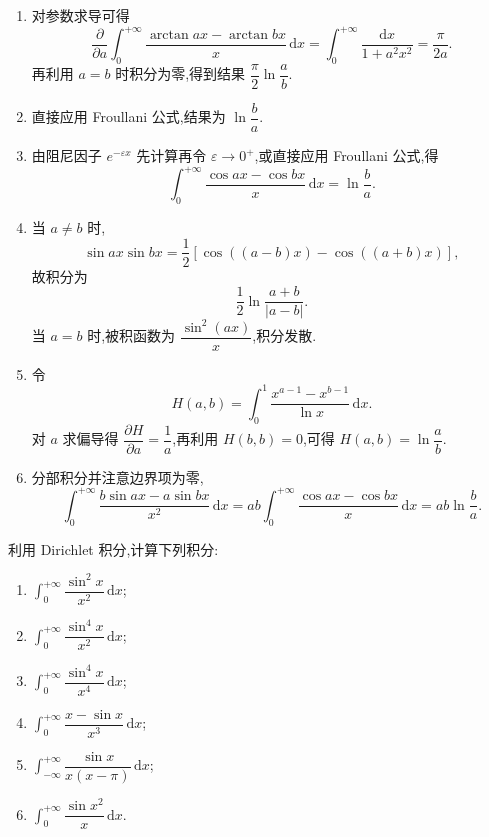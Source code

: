\begin{solution}
  \leavevmode
  \begin{enumerate}
    \item 对参数求导可得
          \[
            \dfrac{\partial}{\partial a}
            \int_0^{+\infty}\dfrac{\arctan ax-\arctan bx}{x}\,\mathrm{d}x
            =\int_0^{+\infty}\dfrac{\mathrm{d}x}{1+a^2x^2}=\dfrac{\pi}{2a}.
          \]
          再利用 $a=b$ 时积分为零,得到结果 $\dfrac{\pi}{2}\ln\dfrac{a}{b}$.

    \item 直接应用 Froullani 公式,结果为 $\ln\dfrac{b}{a}$.

    \item 由阻尼因子 $e^{-\varepsilon x}$ 先计算再令 $\varepsilon\to0^+$,或直接应用
          Froullani 公式,得
          \[
            \displaystyle\int_0^{+\infty}\dfrac{\cos ax-\cos bx}{x}\,\mathrm{d}x
            =\ln\dfrac{b}{a}.
          \]

    \item 当 $a\neq b$ 时,
          \[
            \sin ax\sin bx=\dfrac{1}{2}\left[\cos((a-b)x)-\cos((a+b)x)\right],
          \]
          故积分为
          \[
            \dfrac{1}{2}\ln\dfrac{a+b}{|a-b|}.
          \]
          当 $a=b$ 时,被积函数为 $\dfrac{\sin^2(ax)}{x}$,积分发散.

    \item 令
          \[
            H(a,b)=\int_0^1\dfrac{x^{a-1}-x^{b-1}}{\ln x}\,\mathrm{d}x.
          \]
          对 $a$ 求偏导得 $\dfrac{\partial H}{\partial a}=\dfrac{1}{a}$,再利用
          $H(b,b)=0$,可得 $H(a,b)=\ln\dfrac{a}{b}$.

    \item 分部积分并注意边界项为零,
          \[
            \displaystyle\int_0^{+\infty}\dfrac{b\sin ax-a\sin bx}{x^2}\,\mathrm{d}x
            =ab\int_0^{+\infty}\dfrac{\cos ax-\cos bx}{x}\,\mathrm{d}x
            =ab\ln\dfrac{b}{a}.
          \]
  \end{enumerate}
\end{solution}

\begin{example}
  利用 Dirichlet 积分,计算下列积分:
  \begin{enumerate}
    \item $\displaystyle\int_0^{+\infty}\dfrac{\sin^2x}{x^2}\,\mathrm{d}x$;
    \item $\displaystyle\int_0^{+\infty}\dfrac{\sin^4x}{x^2}\,\mathrm{d}x$;
    \item $\displaystyle\int_0^{+\infty}\dfrac{\sin^4x}{x^4}\,\mathrm{d}x$;
    \item $\displaystyle\int_0^{+\infty}\dfrac{x-\sin x}{x^3}\,\mathrm{d}x$;
    \item $\displaystyle\int_{-\infty}^{+\infty}\dfrac{\sin x}{x(x-\pi)}\,\mathrm{d}x$;
    \item $\displaystyle\int_0^{+\infty}\dfrac{\sin x^2}{x}\,\mathrm{d}x$.
  \end{enumerate}
\end{example}
\exampleblank


